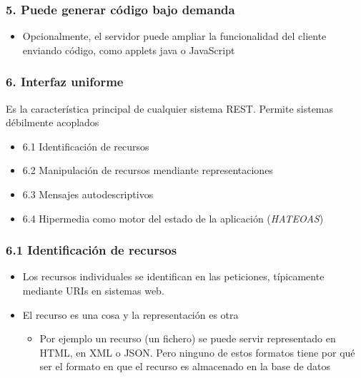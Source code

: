 \documentclass[ucs]{beamer}
\begin{document}
\begin{frame}[fragile]
\frametitle{5. Puede generar código bajo demanda}
\begin{itemize}
\item
Opcionalmente, el servidor puede ampliar la funcionalidad del cliente
enviando código, como applets java o JavaScript
\end{itemize}
\end{frame}

\begin{frame}[fragile]
\frametitle{6. Interfaz uniforme}
Es la característica principal de cualquier sistema REST. Permite sistemas
débilmente acoplados

\begin{itemize}
\item
6.1 Identificación de recursos
\item
6.2 Manipulación de recursos mendiante representaciones
\item
6.3 Mensajes autodescriptivos
\item
6.4 Hipermedia como motor del estado de la aplicación (\emph{HATEOAS})
\end{itemize}

\end{frame}



\begin{frame}[fragile]
\frametitle{6.1 Identificación de recursos}
\begin{itemize}
\item
Los recursos individuales se identifican en las peticiones, típicamente mediante URIs en sistemas web.
\item
El recurso es una cosa y la representación es otra

\begin{itemize}
\item
 Por ejemplo un recurso (un fichero) se puede
servir representado en HTML, en XML o JSON. Pero ninguno de estos formatos tiene por qué ser el
formato en que el recurso es almacenado en la base de datos
\end{itemize}

\end{itemize}

\end{frame}
\end{document}
